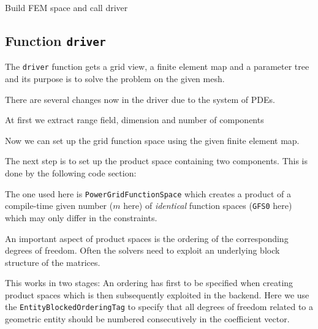 \documentclass[a4paper,12pt]{article}
\theoremstyle{definition}
\theoremstyle{definition}
\begin{document}
Build FEM space and call driver




\subsection{Function \lstinline{driver}}
\label{sec:funct-driver}

The \lstinline{driver} function gets a grid view, a finite element
map and a parameter tree and its purpose is to solve the problem on
the given mesh.

There are several changes now in the driver due to the system of PDEs.

At first we extract range field, dimension and number of components









Now we can set up the grid function space using the given finite
element map.

The next step is to set up the product space containing
two components. This is done by the following code section:

 The one used here is \lstinline{PowerGridFunctionSpace} which creates
a product of a compile-time given number ($m$ here)
of \textit{identical} function spaces (\lstinline{GFS0} here)
which may only differ in the constraints. 

% 


An important aspect of product spaces is the ordering of the corresponding degrees
of freedom. Often the solvers need to exploit an underlying block structure
of the matrices.

This works in two stages: An ordering has first to be specified when creating product spaces
which is then subsequently exploited in the backend.
Here we use the \lstinline{EntityBlockedOrderingTag} to specify that all degrees of
freedom related to a geometric entity should be numbered consecutively in
the coefficient vector.
\end{document}
